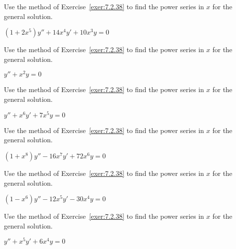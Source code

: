 \documentclass{ximera}
\begin{document}
\begin{problem}\label{exer:7.2.39}
Use the method of
Exercise~\ref{exer:7.2.38}  to find the power series in $x$
 for the general solution.
 
$(1+2x^5)y''+14x^4y'+10x^3y=0$
\end{problem}

\begin{problem}\label{exer:7.2.40} Use the method of
Exercise~\ref{exer:7.2.38}  to find the power series in $x$
 for the general solution.
 
 $y''+x^2y=0$
\end{problem}

\begin{problem}\label{exer:7.2.41}  
Use the method of
Exercise~\ref{exer:7.2.38}  to find the power series in $x$
 for the general solution.
 
$y''+x^6y'+7x^5y=0$
\end{problem}

\begin{problem}\label{exer:7.2.42}
Use the method of
Exercise~\ref{exer:7.2.38}  to find the power series in $x$
 for the general solution.
 
 $(1+x^8)y''-16x^7y'+72x^6y=0$
\end{problem}

\begin{problem}\label{exer:7.2.43} 
Use the method of
Exercise~\ref{exer:7.2.38}  to find the power series in $x$
 for the general solution.
 
$(1-x^6)y''-12x^5y'-30x^4y=0$
\end{problem}

\begin{problem}\label{exer:7.2.44} 
Use the method of
Exercise~\ref{exer:7.2.38}  to find the power series in $x$
 for the general solution.
 
 $y''+x^5y'+6x^4y=0$
\end{problem}
\end{document}
